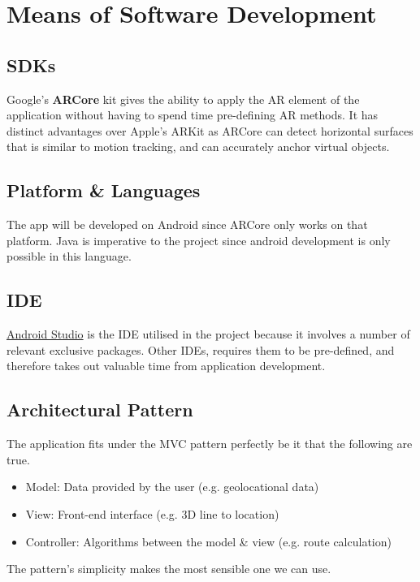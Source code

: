 
\section{Means of Software Development}

\subsection*{SDKs}
Google's \textbf{ARCore} kit gives the ability to apply the AR element of the application without having to spend time pre-defining AR methods. It has distinct advantages over Apple's ARKit as ARCore can detect horizontal surfaces that is similar to motion tracking, and can accurately anchor virtual objects. \cite{newgenapps}

\subsection*{Platform \& Languages}
The app will be developed on Android since ARCore only works on that platform. Java is imperative to the project since android development is only possible in this language.

\subsection*{IDE}
\underline{Android Studio} is the IDE utilised in the project because it involves a number of relevant exclusive packages. Other IDEs, requires them to be pre-defined, and therefore takes out valuable time from application development.

\subsection*{Architectural Pattern}
The application fits under the MVC pattern perfectly be it that the following are true.
\begin{itemize}
    \item Model: Data provided by the user (e.g. geolocational data)
    \item View: Front-end interface (e.g. 3D line to location)
    \item Controller: Algorithms between the model \& view (e.g. route calculation)
\end{itemize}
The pattern's simplicity makes the most sensible one we can use.

